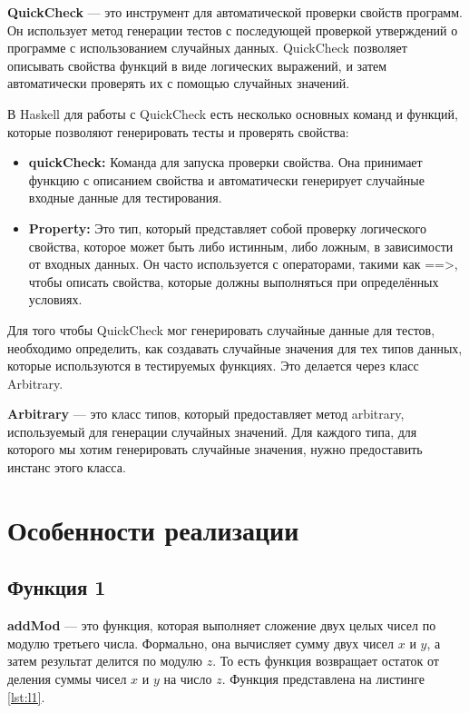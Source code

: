 \documentclass[11pt,a4paper,final]{article} %
\begin{document}
\textbf{QuickCheck} — это инструмент для автоматической проверки свойств программ. Он использует метод генерации тестов с последующей проверкой утверждений о программе с использованием случайных данных. QuickCheck позволяет описывать свойства функций в виде логических выражений, и затем автоматически проверять их с помощью случайных значений. 

В Haskell для работы с QuickCheck есть несколько основных команд и функций, которые позволяют генерировать тесты и проверять свойства:

\begin{itemize}
	\item \textbf{ quickCheck:} Команда для запуска проверки свойства. Она принимает функцию с описанием свойства и автоматически генерирует случайные входные данные для тестирования.
	\item\textbf{ Property:} Это тип, который представляет собой проверку логического свойства, которое может быть либо истинным, либо ложным, в зависимости от входных данных. Он часто используется с операторами, такими как ==>, чтобы описать свойства, которые должны выполняться при определённых условиях.
\end{itemize}

Для того чтобы QuickCheck мог генерировать случайные данные для тестов, необходимо определить, как создавать случайные значения для тех типов данных, которые используются в тестируемых функциях. Это делается через класс Arbitrary.
\par \textbf{Arbitrary} — это класс типов, который предоставляет метод arbitrary, используемый для генерации случайных значений. Для каждого типа, для которого мы хотим генерировать случайные значения, нужно предоставить инстанс этого класса.

\newpage
\section{Особенности реализации}

\subsection{Функция 1}

\textbf{addMod} — это функция, которая выполняет сложение двух целых чисел по модулю третьего числа. Формально, она вычисляет сумму двух чисел $x$ и $y$, а затем результат делится по модулю $z$. То есть функция возвращает остаток от деления суммы чисел $x$ и $y$ на число $z$. Функция представлена на листинге \ref{lst:l1}.
\end{document}
